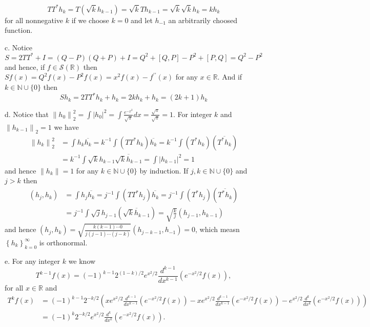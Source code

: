 \documentclass[lang=en,11pt,a4paper,citestyle =authoryear]{elegantpaper}
\newcommand{\Sch}{\mathcal{S}}
\begin{document}
\[T T^{*} h_{k}=T\left(\sqrt{k} h_{k-1}\right)=\sqrt{k} T h_{k-1}=\sqrt{k} \sqrt{k} h_{k}=k h_{k}\]
for all nonnegative $k$ if we choose $k = 0$ and let $h_{-1}$ an arbitrarily choosed function.\par
c. Notice 
\[S=2 T T^{*}+I=(Q-P)(Q+P)+I=Q^{2}+[Q, P]-P^{2}+[P, Q]=Q^{2}-P^{2}\]
and hence, if $f \in \Sch(\mathbb{R})$ then $S f(x)=Q^{2} f(x)-P^{2} f(x)=x^{2} f(x)-f^{\prime \prime}(x)$ for any $x \in \mathbb{R}$. And if $k \in \mathbb{N} \cup\{0\}$ then
\[
S h_{k}=2 T T^{*} h_{k}+h_{k}=2 k h_{k}+h_{k}=(2 k+1) h_{k}
\]\par
d. Notice that $\left\|h_{0}\right\|_{2}^{2}=\int\left|h_{0}\right|^{2}=\int \frac{e^{-x^{2}}}{\sqrt{\pi}} d x=\frac{\sqrt{\pi}}{\sqrt{\pi}}=1$. For integer $k$ and $\left\|h_{k-1}\right\|_{2}=1$ we have
\[\begin{aligned}
\left\|h_{k}\right\|_{2}^{2}&=\int h_{k} \overline{h_{k}}=k^{-1} \int\left(T T^{*} h_{k}\right) \overline{h_{k}}=k^{-1} \int\left(T^{*} h_{k}\right)\left(\overline{T^{*} h_{k}}\right)\\ &=k^{-1} \int \sqrt{k} h_{k-1} \overline{\sqrt{k} h_{k-1}}=\int\left|h_{k-1}\right|^{2}=1
\end{aligned}
\]
and hence $\left\|h_{k}\right\|=1$ for any $k \in \mathbb{N} \cup\{0\}$ by induction. If $j, k \in \mathbb{N} \cup\{0\}$ and $j>k$ then
\[
\begin{aligned}
\left(h_{j}, h_{k}\right)&=\int h_{j} \overline{h_{k}}=j^{-1} \int\left(T T^{*} h_{j}\right) \overline{h_{k}}=j^{-1} \int\left(T^{*} h_{j}\right)\left(\overline{T^{*} h_{k}}\right)\\ &=j^{-1} \int \sqrt{j} h_{j-1}\left(\overline{\sqrt{k} h_{k-1}}\right)=\sqrt{\frac{k}{j}}\left(h_{j-1}, h_{k-1}\right)
\end{aligned}
\]
and hence $\left(h_{j}, h_{k}\right)=\sqrt{\frac{k(k-1) \cdots 0}{j(j-1) \cdots(j-k)}}\left(h_{j-k-1}, h_{-1}\right)=0$, which measn $\left\{h_{k}\right\}_{k=0}^{\infty}$ is orthonormal.\par
e. For any integer $k$ we know
\[
T^{k-1} f(x)=(-1)^{k-1} 2^{(1-k) / 2} e^{x^{2} / 2} \frac{d^{k-1}}{d x^{k-1}}\left(e^{-x^{2} / 2} f(x)\right),
\]
for all $x \in \mathbb{R}$ and
\[
\begin{aligned}
T^{k} f(x) & =(-1)^{k-1} 2^{-k / 2}\left(x e^{x^{2} / 2} \frac{d^{k-1}}{d x^{k-1}}\left(e^{-x^{2} / 2} f(x)\right)-x e^{x^{2} / 2} \frac{d^{k-1}}{d x^{k-1}}\left(e^{-x^{2} / 2} f(x)\right)-e^{x^{2} / 2} \frac{d^{k}}{d x^{k}}\left(e^{-x^{2} / 2} f(x)\right)\right) \\
& =(-1)^{k} 2^{-k / 2} e^{x^{2} / 2} \frac{d^{k}}{d x^{k}}\left(e^{-x^{2} / 2} f(x)\right) .
\end{aligned}
\]
\end{document}
